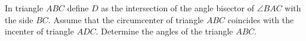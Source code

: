 In triangle $ABC$ define $D$ as the intersection of the angle bisector of $\angle BAC$
with the side $BC$. Assume that the circumcenter of triangle $ABC$ coincides with the
incenter of triangle $ADC$. Determine the angles of the triangle $ABC$.
